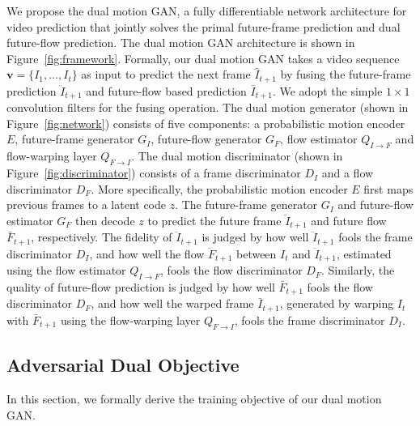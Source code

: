 \documentclass[10pt,twocolumn,letterpaper]{article}
\begin{document}
	We propose the dual motion GAN, a fully differentiable network architecture for video prediction that jointly solves the primal future-frame prediction and dual future-flow prediction. The dual motion GAN architecture is shown in Figure~\ref{fig:framework}. Formally, our dual motion GAN takes a video sequence $\mathbf{v} = \{I_1, \dots, I_t\}$ as input to predict the next frame $\hat{I}_{t+1}$ by fusing the future-frame prediction $\ddot{I}_{t+1}$ and future-flow based prediction $\bar{I}_{t+1}$. We adopt the simple $1\times1$ convolution filters for the fusing operation. The dual motion generator (shown in Figure~\ref{fig:network}) consists of five components: a probabilistic motion encoder $E$, future-frame generator $G_I$, future-flow generator $G_F$, flow estimator $Q_{I\rightarrow F}$ and flow-warping layer $Q_{F\rightarrow I}$. The dual motion discriminator (shown in Figure~\ref{fig:discriminator}) consists of a frame discriminator $D_I$ and a flow discriminator $D_F$. More specifically, the probabilistic motion encoder $E$ first maps previous frames to a latent code $z$. The future-frame generator $G_I$ and future-flow estimator $G_F$ then decode $z$ to predict the future frame $\ddot{I}_{t+1}$ and future flow $\bar{F}_{t+1}$, respectively. The fidelity of $\ddot{I}_{t+1}$ is judged by how well $\ddot{I}_{t+1}$ fools the frame discriminator $D_I$, and how well the flow $\ddot{F}_{t+1}$ between $I_t$ and $\ddot{I}_{t+1}$, estimated using the flow estimator $Q_{I\rightarrow F}$, fools the flow discriminator $D_F$. Similarly, the quality of future-flow prediction is judged by how well $\bar{F}_{t+1}$ fools the flow discriminator $D_F$, and how well the warped frame $\bar{I}_{t+1}$, generated by warping $I_t$ with $\bar{F}_{t+1}$ using the flow-warping layer $Q_{F\rightarrow I}$, fools the frame discriminator $D_I$. %
	
	

	
	\subsection{Adversarial Dual Objective}
	\label{sec:objective}	
	In this section, we formally derive the training objective of our dual motion GAN. 
	
\end{document}
